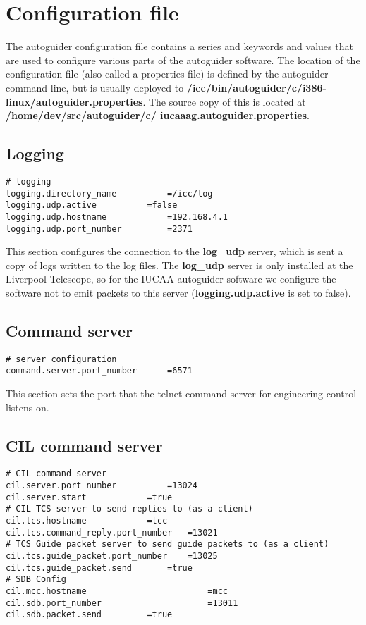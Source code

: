 \documentclass[10pt,a4paper]{article}
\begin{document}
\section{Configuration file}

The autoguider configuration file contains a series and keywords and values that are used to configure various parts of the autoguider software. The location of the configuration file (also called a properties file) is defined by the
autoguider command line, but is usually deployed to {\bf /icc/bin/autoguider/c/i386-linux/autoguider.properties}. The
source copy of this is located at {\bf /home/dev/src/autoguider/c/ iucaaag.autoguider.properties}.

\subsection{Logging}

\begin{verbatim}
# logging
logging.directory_name			=/icc/log
logging.udp.active			=false
logging.udp.hostname			=192.168.4.1
logging.udp.port_number			=2371
\end{verbatim}

This section configures the connection to the {\bf log\_udp} server, which is sent a copy of logs written to the log
files. The {\bf log\_udp} server is only installed at the Liverpool Telescope, so for the IUCAA autoguider software
we configure the software not to emit packets to this server ({\bf logging.udp.active} is set to false).

\subsection{Command server}

\begin{verbatim}
# server configuration
command.server.port_number		=6571
\end{verbatim}

This section sets the port that the telnet command server for engineering control listens on. 

\subsection{CIL command server}

\begin{verbatim}
# CIL command server
cil.server.port_number			=13024
cil.server.start			=true
# CIL TCS server to send replies to (as a client)
cil.tcs.hostname			=tcc
cil.tcs.command_reply.port_number	=13021
# TCS Guide packet server to send guide packets to (as a client)
cil.tcs.guide_packet.port_number	=13025
cil.tcs.guide_packet.send		=true
# SDB Config
cil.mcc.hostname                        =mcc
cil.sdb.port_number                     =13011
cil.sdb.packet.send			=true
\end{verbatim}
\end{document}
